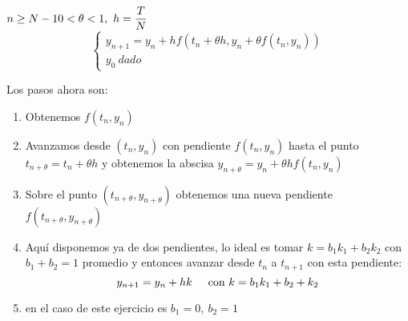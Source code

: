 \documentclass[openany]{book}
\begin{document}
    \setcounter{ex}{12}

    \begin{exercise}
        $ n\geq N-1\\ 0 < \theta < 1,\ h=\dfrac{T}{N} $
        $$ \left\{
        \begin{array}{l}
            y_{n+1} = y_n+h f(t_n+ \theta h, y_n+ \theta f(t_n,y_n) )\\
            y_0\ dado
        \end{array}
        \right. $$

        Los pasos ahora son:
        \begin{enumerate}
            \item Obtenemos $ f(t_n,y_n) $
            \item Avanzamos desde $ (t_n,y_n) $ con pendiente $ f(t_n,y_n) $ hasta el punto $ t_{n+\theta} = t_n+ \theta h $ y obtenemos la abscisa $ y_{n+\theta} = y_n+\theta hf(t_n,y_n) $
            \item Sobre el punto $ (t_{n+\theta},y_{n+\theta}) $ obtenemos una nueva pendiente $ f(t_{n+\theta},y_{n+\theta}) $
            \item Aquí disponemos ya de dos pendientes, lo ideal es tomar $ k = b_1k_1+b_2k_2  $ con $ b_1+b_2 = 1 $ promedio y entonces avanzar desde $ t_n $ a $ t_{n+1} $ con esta pendiente:
                $$ y_{n+1} = y_n + hk \hspace{5mm} \text{con } k = b_1k_1+b_2+k_2 $$
            \item en el caso de este ejercicio es $ b_1 = 0,\ b_2 = 1 $ 


        \end{enumerate}
    
    \end{exercise}

    
\end{document}

